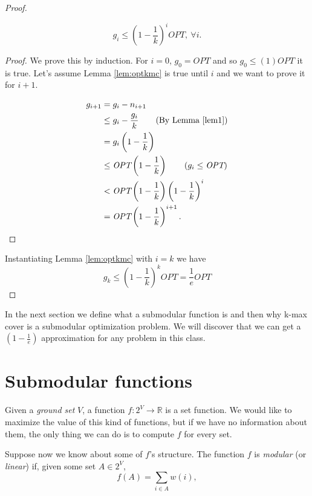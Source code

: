 \begin{proof}
	\begin{lem}\label{lem:optkmc}
		\begin{equation}
		g_i \leq \left(1 - \frac{1}{k}\right)^i\textit{OPT},\ \forall i.
		\end{equation}
	\end{lem}
	\begin{proof}
		We prove this by induction. For $i = 0$, $g_0 = \textit{OPT}$ and so $g_0 \leq (1)\textit{OPT}$ it is true. Let's assume Lemma \ref{lem:optkmc} is true until $i$ and we want to prove it for $i+1$.
		
		\begin{align}
		g_{i + 1} &= g_i - n_{i+1}\\
		&\leq g_i - \frac{g_i}{k} \tag{By Lemma \ref{lem1}}\\
		&= g_i\left(1 - \frac{1}{k}\right)\\
		&\leq \textit{OPT}\left(1 - \frac{1}{k}\right) \tag{$g_i \leq \textit{OPT}$}\\
		&< \textit{OPT}\left(1 - \frac{1}{k}\right)\left(1 - \frac{1}{k}\right)^i\\
		&= \textit{OPT}\left(1 - \frac{1}{k}\right)^{i+1}.
		\end{align}
	\end{proof}
	
	Instantiating Lemma \ref{lem:optkmc} with $i = k$ we have
	\begin{equation}
	g_k \leq \left(1 -	\frac{1}{k}\right)^k\textit{OPT} = \frac{1}{e}\textit{OPT}
	\end{equation}
	
\end{proof}
In the next section we define what a submodular function is and then why k-max cover is a submodular optimization problem. We will discover that we can get a $(1 - \frac{1}{e})$ approximation for any problem in this class. 


\section{Submodular functions}

Given a \emph{ground set} $V$, a function $f:2^V \rightarrow \mathbb{R}$ is a set function. We would like to maximize the value of this kind of functions, but if we have no information about them, the only thing we can do is to compute $f$ for every set.

Suppose now we know about some of $f$'s structure. The function $f$ is \emph{modular} (or \emph{linear}) if, given some set $A \in 2^V$,
\begin{equation}\label{eq:modular}
	f(A) = \sum_{i \in A} w(i),
\end{equation}

